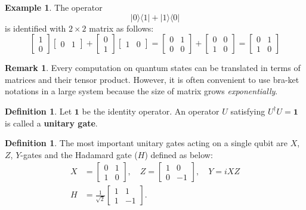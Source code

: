 \documentclass{beamer}
\theoremstyle{plain}
\theoremstyle{definition}
\newtheorem{defn}[thm]{Definition}
\newtheorem{exmp}[thm]{Example}
\newtheorem{rem}[thm]{Remark}
\begin{document}
\begin{frame}
\begin{exmp}
The operator 
	$$|0\rangle\langle1|+|1\rangle\langle0|$$
is identified with $2\times2$ matrix as follows:
	$$\begin{bmatrix}
		1 \\ 0
	\end{bmatrix}\begin{bmatrix}
		0 & 1
	\end{bmatrix} + \begin{bmatrix}
		0 \\ 1
	\end{bmatrix}\begin{bmatrix}
		1 & 0
	\end{bmatrix} = \begin{bmatrix}
		0 & 1 \\ 0 & 0
	\end{bmatrix} + \begin{bmatrix}
		0 & 0 \\ 1 & 0
	\end{bmatrix} = \begin{bmatrix}
		0 & 1 \\ 1 & 0
	\end{bmatrix}$$
\end{exmp}
\begin{rem}
Every computation on quantum states can be translated in terms of matrices
and their tensor product. However, it is often convenient to use 
bra-ket notations in a large system because the size of matrix 
grows \textit{exponentially}.
\end{rem}
\end{frame}

\begin{frame}
\begin{defn}
Let $\mathbf 1$ be the identity operator.
An operator $U$ satisfying $U^\dagger U = \mathbf 1$ is called a \textbf{unitary gate}.
\end{defn}
\begin{defn}
The most important unitary gates acting on a single qubit
are $X$, $Z$, $Y$-gates and the Hadamard gate ($H$) defined as below:
	\begin{align*}
	X &= \begin{bmatrix}
		0 & 1 \\ 1 & 0 
	\end{bmatrix},\quad Z = \begin{bmatrix}
		1 & 0 \\ 0 & -1
	\end{bmatrix},\quad Y = iXZ\\
	H &= \frac{1}{\sqrt2}\begin{bmatrix}
		1 & 1 \\ 1 & -1
	\end{bmatrix}.
	\end{align*}
\end{defn}
\end{frame}
\end{document}
